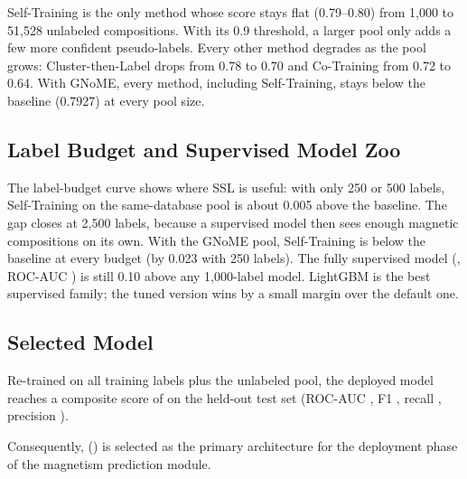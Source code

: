 
Self-Training is the only method whose score stays flat (0.79--0.80) from 1,000 to 51,528
unlabeled compositions. With its 0.9 threshold, a larger pool only adds a few more confident
pseudo-labels. Every other method degrades as the pool grows: Cluster-then-Label drops from
0.78 to 0.70 and Co-Training from 0.72 to 0.64. With GNoME, every method, including
Self-Training, stays below the baseline (0.7927) at every pool size.

\subsection*{Label Budget and Supervised Model Zoo}



The label-budget curve shows where SSL is useful: with only 250 or 500 labels, Self-Training
on the same-database pool is about 0.005 above the baseline. The gap closes at 2,500 labels,
because a supervised model then sees enough magnetic compositions on its own. With the GNoME
pool, Self-Training is below the baseline at every budget (by 0.023 with 250 labels). The fully supervised model
(\MagInFullComp{}, ROC-AUC \MagInFullAUC{}) is still 0.10 above any 1,000-label model.
LightGBM is the best supervised family; the tuned version wins by a small margin over the
default one.

\subsection*{Selected Model}

Re-trained on all training labels plus the unlabeled pool, the deployed model reaches a
composite score of \MagSelComp{} on the held-out test set (ROC-AUC \MagSelAUC{}, F1
\MagSelFone{}, recall \MagSelRec{}, precision \MagSelPrec{}).

Consequently, \textbf{\MagSelMethod{}} (\texttt{\MagSelConfig}) is selected as the primary
architecture for the deployment phase of the magnetism prediction module.
